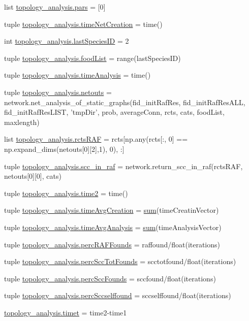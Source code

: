 \begin{DoxyCompactItemize}
\item 
list \hyperlink{a00128_a516f339905d01b02a4e16181f2fde4be}{topology\-\_\-analysis.\-pars} = \mbox{[}0\mbox{]}
\item 
tuple \hyperlink{a00128_a2f85d448268dd44ad47f66b65bfa45b6}{topology\-\_\-analysis.\-time\-Net\-Creation} = time()
\item 
int \hyperlink{a00128_a1aa5d59ebf308accb3c960b5fd90a445}{topology\-\_\-analysis.\-last\-Species\-I\-D} = 2
\item 
tuple \hyperlink{a00128_a96850fa3d62df1176a8d7a5b988f4a32}{topology\-\_\-analysis.\-food\-List} = range(last\-Species\-I\-D)
\item 
tuple \hyperlink{a00128_ace5bda70ff24e6a220afb4438240003a}{topology\-\_\-analysis.\-time\-Analysis} = time()
\item 
tuple \hyperlink{a00128_af42f57da8ba80463f419efaf0f6f2c33}{topology\-\_\-analysis.\-netouts} = network.\-net\-\_\-analysis\-\_\-of\-\_\-static\-\_\-graphs(fid\-\_\-init\-Raf\-Res, fid\-\_\-init\-Raf\-Res\-A\-L\-L, fid\-\_\-init\-Raf\-Res\-L\-I\-S\-T, 'tmp\-Dir', prob, average\-Conn, rcts, cats, food\-List, maxlength)
\item 
list \hyperlink{a00128_aeb909c76682b690cc5ab6aca5ac37c4d}{topology\-\_\-analysis.\-rcts\-R\-A\-F} = rcts\mbox{[}np.\-any(rcts\mbox{[}\-:, 0\mbox{]} == np.\-expand\-\_\-dims(netouts\mbox{[}0\mbox{]}\mbox{[}2\mbox{]},1), 0), \-:\mbox{]}
\item 
tuple \hyperlink{a00128_ac864e2a75b705766c1d81f68897f52c0}{topology\-\_\-analysis.\-scc\-\_\-in\-\_\-raf} = network.\-return\-\_\-scc\-\_\-in\-\_\-raf(rcts\-R\-A\-F, netouts\mbox{[}0\mbox{]}\mbox{[}0\mbox{]}, cats)
\item 
tuple \hyperlink{a00128_a44666efa43bfc08ab8305c8d325f7456}{topology\-\_\-analysis.\-time2} = time()
\item 
tuple \hyperlink{a00128_a4cd61f10a5a0a8d80608e71a1fc2009c}{topology\-\_\-analysis.\-time\-Avg\-Creation} = \hyperlink{a00021_a5330c3728d2e8d052841f1bbf8d33845}{sum}(time\-Creatin\-Vector)
\item 
tuple \hyperlink{a00128_a0689e49982e7bedba8ac4eb5534963db}{topology\-\_\-analysis.\-time\-Avg\-Analysis} = \hyperlink{a00021_a5330c3728d2e8d052841f1bbf8d33845}{sum}(time\-Analysis\-Vector)
\item 
tuple \hyperlink{a00128_a51a66ce80f70aeab8bde70af9960e419}{topology\-\_\-analysis.\-perc\-R\-A\-F\-Founds} = raffound/float(iterations)
\item 
tuple \hyperlink{a00128_aee49954a6b9abb7c4bd677c17ed4013b}{topology\-\_\-analysis.\-perc\-Scc\-Tot\-Founds} = scctotfound/float(iterations)
\item 
tuple \hyperlink{a00128_a14f23c89de77042b80e78e1d9ab7b754}{topology\-\_\-analysis.\-perc\-Scc\-Founds} = sccfound/float(iterations)
\item 
tuple \hyperlink{a00128_a8bf55c62b8e7385526396a9003e343bb}{topology\-\_\-analysis.\-perc\-Sccselffound} = sccselffound/float(iterations)
\item 
\hyperlink{a00128_a5b12bbbc66679be171ab082dbaeba90b}{topology\-\_\-analysis.\-timet} = time2-\/time1
\end{DoxyCompactItemize}
